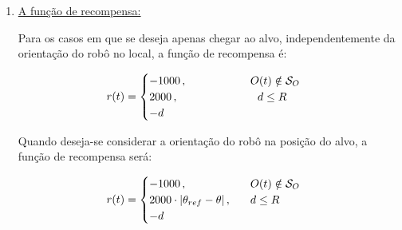\begin{enumerate}[label=\alph*)]
	\item \underline{A função de recompensa:}
	
	Para os casos em que se deseja apenas chegar ao alvo, independentemente da orientação do robô no local, a função de recompensa é:
	
%	
	
	\begin{align}\label{eq:4ec-carrinhorecompsemang}
	\begin{split}
	r(t)=\begin{cases}
	-1000\,,\hspace{2cm} O(t)\notin\mathcal{S}_O\\
	2000\,,\hspace{2.5cm} d\le R\\
	-d
	\end{cases}
	\end{split}
	\end{align}
	
	Quando deseja-se considerar a orientação do robô na posição do alvo, a função de recompensa será:
	
	\begin{align}\label{eq:4ec-carrinhorecompcomang}
	\begin{split}
	r(t)=\begin{cases}
	-1000\,,\hspace{2cm} O(t)\notin\mathcal{S}_O\\
	2000\cdot|\theta_{ref}-\theta|\,,\hspace{0.6cm} d\le R\\
	-d
	\end{cases}
	\end{split}
	\end{align}
	

\end{enumerate}

